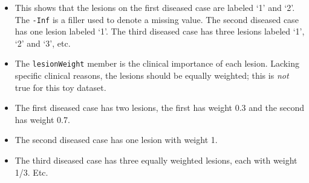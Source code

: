 \documentclass[
]{book}
\newenvironment{Shaded}{\begin{snugshade}}{\end{snugshade}}
\newcommand{\CommentTok}[1]{\textcolor[rgb]{0.56,0.35,0.01}{\textit{#1}}}
\newcommand{\NormalTok}[1]{#1}
\newcommand{\SpecialCharTok}[1]{\textcolor[rgb]{0.00,0.00,0.00}{#1}}
\providecommand{\tightlist}{%
  \setlength{\itemsep}{0pt}\setlength{\parskip}{0pt}}
\begin{document}
\begin{Shaded}
\end{Shaded}

\begin{itemize}
\tightlist
\item
  This shows that the lesions on the first diseased case are labeled `1' and `2'. The \texttt{-Inf} is a filler used to denote a missing value. The second diseased case has one lesion labeled `1'. The third diseased case has three lesions labeled `1', `2' and `3', etc.
\item
  The \texttt{lesionWeight} member is the clinical importance of each lesion. Lacking specific clinical reasons, the lesions should be equally weighted; this is \emph{not} true for this toy dataset.
\end{itemize}

\begin{Shaded}
\end{Shaded}

\begin{itemize}
\tightlist
\item
  The first diseased case has two lesions, the first has weight 0.3 and the second has weight 0.7.
\item
  The second diseased case has one lesion with weight 1.
\item
  The third diseased case has three equally weighted lesions, each with weight 1/3. Etc.
\end{itemize}
\end{document}
